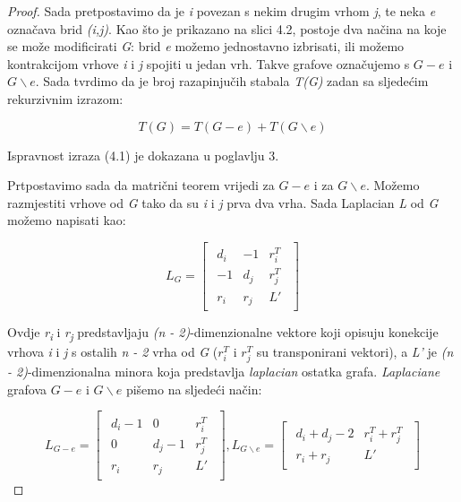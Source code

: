 \documentclass[times, utf8, zavrsni]{fer}
\begin{document}
\begin{proof}
Sada pretpostavimo da je \textit{i} povezan s nekim drugim vrhom \textit{j}, te neka \textit{e} označava brid \textit{(i,j)}. Kao što je prikazano na slici 4.2, postoje dva načina na koje se može modificirati \textit{G}: brid \textit{e} možemo jednostavno izbrisati, ili možemo kontrakcijom vrhove \textit{i} i \textit{j} spojiti u jedan vrh. Takve grafove označujemo s $G - e$ i $G \backslash e$. Sada tvrdimo da je broj razapinjučih stabala \textit{T(G)} zadan sa sljedećim rekurzivnim izrazom:

\begin{equation}
	T(G) = T(G - e) + T(G \backslash e)
\end{equation}

Ispravnost izraza (4.1) je dokazana u poglavlju 3.

Prtpostavimo sada da matrični teorem vrijedi za $G - e$ i za $G \backslash e$. Možemo razmjestiti vrhove od \textit{G} tako da su \textit{i} i \textit{j} prva dva vrha. Sada Laplacian \textit{L} od \textit{G} možemo napisati kao:

\[
L_G =
\begin{bmatrix}
	\begin{array}{c|c|c}
		d_i & -1 & r_i^T \\
		\hline
		-1 & d_j & r_j^T \\
		\hline
		r_i & r_j & L'
	\end{array}
\end{bmatrix}
\]

Ovdje \textit{r\textsubscript{i}} i \textit{r\textsubscript{j}} predstavljaju \textit{(n - 2)}-dimenzionalne vektore koji opisuju konekcije vrhova \textit{i} i \textit{j} s ostalih \textit{n - 2} vrha od \textit{G} ($r_i^T$ i $r_j^T$ su transponirani vektori), a \textit{L'} je \textit{(n - 2)}-dimenzionalna minora koja predstavlja \textit{laplacian} ostatka grafa. \textit{Laplaciane} grafova $G - e$ i $G \backslash e$ pišemo na sljedeći način:

\[
L_{G - e} = 
\begin{bmatrix}
	\begin{array}{c|c|c}
		d_i - 1 & 0 & r_i^T \\
		\hline
		0 & d_j - 1 & r_j^T \\
		\hline
		r_i & r_j & L'
	\end{array}
\end{bmatrix},
L_{G \backslash e} = 
\begin{bmatrix}
	\begin{array}{c|c}
		d_i + d_j - 2 & r_i^T + r_j^T \\
		\hline
		r_i + r_j & L'
	\end{array}
\end{bmatrix}
\]


\end{proof}
\end{document}
